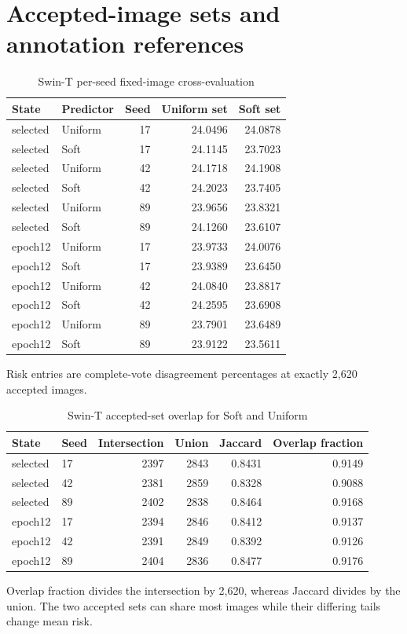 \documentclass[10pt]{article}
\begin{document}
\clearpage\section{Accepted-image sets and annotation references}\label{supp:accepted}
\begin{longtable}{llrrr}\caption{Swin-T per-seed fixed-image cross-evaluation}\\\toprule State & Predictor & Seed & Uniform set & Soft set\\\midrule\endhead
selected & Uniform & 17 & 24.0496 & 24.0878\\
selected & Soft & 17 & 24.1145 & 23.7023\\
selected & Uniform & 42 & 24.1718 & 24.1908\\
selected & Soft & 42 & 24.2023 & 23.7405\\
selected & Uniform & 89 & 23.9656 & 23.8321\\
selected & Soft & 89 & 24.1260 & 23.6107\\
epoch12 & Uniform & 17 & 23.9733 & 24.0076\\
epoch12 & Soft & 17 & 23.9389 & 23.6450\\
epoch12 & Uniform & 42 & 24.0840 & 23.8817\\
epoch12 & Soft & 42 & 24.2595 & 23.6908\\
epoch12 & Uniform & 89 & 23.7901 & 23.6489\\
epoch12 & Soft & 89 & 23.9122 & 23.5611\\
\bottomrule\end{longtable}
Risk entries are complete-vote disagreement percentages at exactly 2,620 accepted images.
\begin{longtable}{llrrrr}\caption{Swin-T accepted-set overlap for Soft and Uniform}\\\toprule State & Seed & Intersection & Union & Jaccard & Overlap fraction\\\midrule\endhead
selected & 17 & 2397 & 2843 & 0.8431 & 0.9149\\
selected & 42 & 2381 & 2859 & 0.8328 & 0.9088\\
selected & 89 & 2402 & 2838 & 0.8464 & 0.9168\\
epoch12 & 17 & 2394 & 2846 & 0.8412 & 0.9137\\
epoch12 & 42 & 2391 & 2849 & 0.8392 & 0.9126\\
epoch12 & 89 & 2404 & 2836 & 0.8477 & 0.9176\\
\bottomrule\end{longtable}
Overlap fraction divides the intersection by 2,620, whereas Jaccard divides by the union. The two accepted sets can share most images while their differing tails change mean risk.
\end{document}
